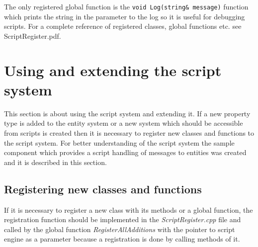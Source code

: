 
The only registered global function is the \verb/void Log(string& message)/ function which prints the string in the parameter to the log so it is useful for debugging scripts. For a complete reference of registered classes, global functions etc. see ScriptRegister.pdf.

\section{Using and extending the script system}

This section is about using the script system and extending it. If a new property type is added to the entity system or a new system which should be accessible from scripts is created then it is necessary to register new classes and functions to the script system. For better understanding of the script system the sample component which provides a script handling of messages to entities was created and it is described in this section.

\subsection{Registering new classes and functions}
\label{sub:script-registering}

If it is necessary to register a new class with its methods or a global function, the registration function should be implemented in the \emph{ScriptRegister.cpp} file and called by the global function \emph{RegisterAllAdditions} with the pointer to script engine as a parameter because a registration is done by calling methods of it.

